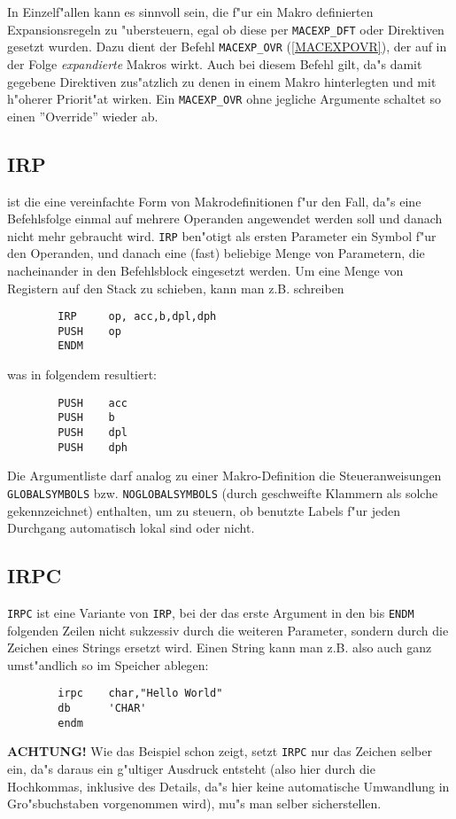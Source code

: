\documentclass[12pt,a4paper,twoside]{report}
\makeatletter
\newcommand{\bb}[1]{{\bf #1}}
\newcommand{\tty}[1]{{\tt #1}}
\newcommand{\ttindex}[1]{\index{#1@{\tt #1}}}
\makeatother
\begin{document}
In Einzelf"allen kann es sinnvoll sein, die f"ur ein Makro definierten
Expansionsregeln zu "ubersteuern, egal ob diese per \tty{MACEXP\_DFT} oder
Direktiven gesetzt wurden.  Dazu dient der Befehl \tty{MACEXP\_OVR}
(\ref{MACEXPOVR}), der auf in der Folge {\it expandierte} Makros wirkt.  Auch
bei diesem Befehl gilt, da"s damit gegebene Direktiven zus"atzlich zu
denen in einem Makro hinterlegten und mit h"oherer Priorit"at wirken.  Ein
\tty{MACEXP\_OVR} ohne jegliche Argumente schaltet so einen ''Override''
wieder ab.


\subsection{IRP}
\ttindex{IRP}

ist die eine vereinfachte Form von Makrodefinitionen f"ur den Fall,
da"s eine Befehlsfolge einmal auf mehrere Operanden angewendet werden
soll und danach nicht mehr gebraucht wird.  \tty{IRP} ben"otigt als ersten
Parameter ein Symbol f"ur den Operanden, und danach eine (fast)
beliebige Menge von Parametern, die nacheinander in den Befehlsblock
eingesetzt werden.  Um eine Menge von Registern auf den Stack zu
schieben, kann man z.B. schreiben
\begin{verbatim}
        IRP     op, acc,b,dpl,dph
        PUSH    op
        ENDM
\end{verbatim}
was in folgendem resultiert:
\begin{verbatim}
        PUSH    acc
        PUSH    b
        PUSH    dpl
        PUSH    dph
\end{verbatim}
Die Argumentliste darf analog zu einer Makro-Definition die
Steueranweisungen \tty{GLOBALSYMBOLS} bzw. \tty{NOGLOBALSYMBOLS} (durch
geschweifte Klammern als solche gekennzeichnet) enthalten, um zu
steuern, ob benutzte Labels f"ur jeden Durchgang automatisch lokal
sind oder nicht.


\subsection{IRPC}
\ttindex{IRPC}

\tty{IRPC} ist eine Variante von \tty{IRP}, bei der das erste Argument in
den bis \tty{ENDM} folgenden Zeilen nicht sukzessiv durch die weiteren
Parameter, sondern durch die Zeichen eines Strings ersetzt wird.  Einen
String kann man z.B. also auch ganz umst"andlich so im Speicher ablegen:
\begin{verbatim}
        irpc    char,"Hello World"
        db      'CHAR'
        endm
\end{verbatim}
\bb{ACHTUNG!} Wie das Beispiel schon zeigt, setzt \tty{IRPC} nur das
Zeichen selber ein, da"s daraus ein g"ultiger Ausdruck entsteht (also hier
durch die Hochkommas, inklusive des Details, da"s hier keine automatische
Umwandlung in Gro"sbuchstaben vorgenommen wird), mu"s man selber
sicherstellen.
\end{document}
